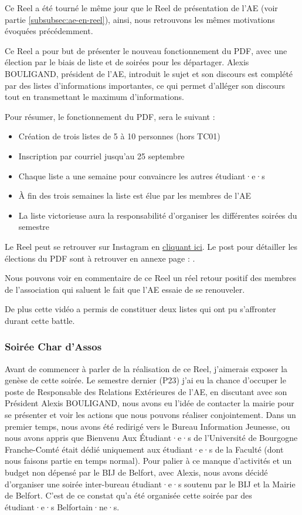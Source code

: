 Ce Reel a été tourné le même jour que le Reel de présentation de l'\gls{AE} (voir partie \ref{subsubsec:ae-en-reel}), ainsi, nous retrouvons les mêmes motivations évoquées précédemment.

Ce Reel a pour but de présenter le nouveau fonctionnement du \gls{PDF}, avec une élection par le biais de liste et de soirées pour les départager.
Alexis BOULIGAND, président de l'\gls{AE}, introduit le sujet et son discours est complété par des listes d'informations importantes, ce qui permet d'alléger son discours tout en transmettant le maximum d'informations.

Pour résumer, le fonctionnement du \gls{PDF}, sera le suivant :
\begin{itemize}
    \item Création de trois listes de 5 à 10 personnes (hors TC01)
    \item Inscription par courriel jusqu'au 25 septembre
    \item Chaque liste a une semaine pour convaincre les autres étudiant·e·s
    \item À fin des trois semaines la liste est élue par les membres de l'\gls{AE}
    \item La liste victorieuse aura la responsabilité d'organiser les différentes soirées du semestre
\end{itemize}

Le Reel peut se retrouver sur Instagram en \href{https://www.instagram.com/reel/CxQtgEXMqon/?utm_source=ig_web_copy_link&igshid=MzRlODBiNWFlZA==}{cliquant ici}.
Le post pour détailler les élections du \gls{PDF} sont à retrouver en annexe page : \pageref{subsec:interface-instagram}.

Nous pouvons voir en commentaire de ce Reel un réel retour positif des membres de l'association qui saluent le fait que l'\gls{AE} essaie de se renouveler.

De plus cette vidéo a permis de constituer deux listes qui ont pu s'affronter durant cette battle.

\subsubsection{Soirée Char d'Assos}

Avant de commencer à parler de la réalisation de ce Reel, j'aimerais exposer la genèse de cette soirée.
Le semestre dernier (P23) j'ai eu la chance d'occuper le poste de Responsable des Relations Extérieures de l'\gls{AE}, en discutant avec son Président Alexis BOULIGAND, nous avons eu l'idée de contacter la mairie pour se présenter et voir les actions que nous pouvons réaliser conjointement.
Dans un premier temps, nous avons été redirigé vers le Bureau Information Jeunesse, ou nous avons appris que Bienvenu Aux Étudiant·e·s de l'Université de Bourgogne Franche-Comté était dédié uniquement aux étudiant·e·s de la Faculté (dont nous faisons partie en temps normal).
Pour palier à ce manque d'activités et un budget non dépensé par le BIJ de Belfort, avec Alexis, nous avons décidé d'organiser une soirée inter-bureau étudiant·e·s soutenu par le BIJ et la Mairie de Belfort.
C'est de ce constat qu'a été organisée cette soirée par des étudiant·e·s Belfortain·ne·s.

